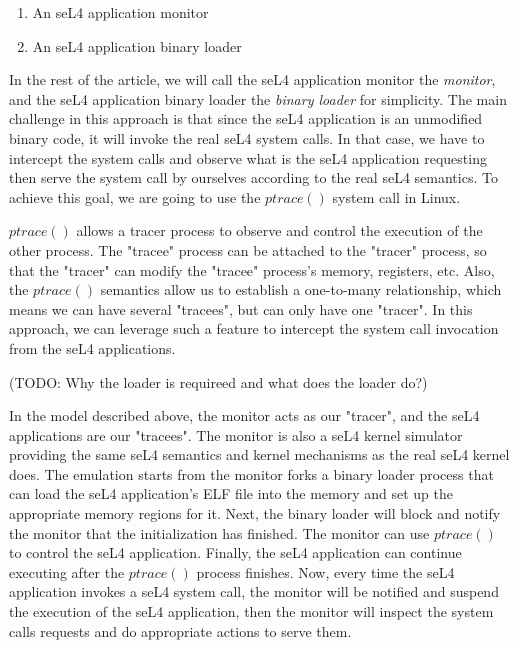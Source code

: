 \begin{enumerate}
    \item An seL4 application monitor
    \item An seL4 application binary loader 
\end{enumerate}

In the rest of the article, we will call the seL4 application monitor the \emph{monitor}, and the seL4 application binary loader the \emph{binary loader} for simplicity. The main challenge in this approach is that since the seL4 application is an unmodified binary code, it will invoke the real seL4 system calls. In that case, we have to intercept the system calls and observe what is the seL4 application requesting then serve the system call by ourselves according to the real seL4 semantics. To achieve this goal, we are going to use the $ptrace()$ system call in Linux.

$ptrace()$ allows a tracer process to observe and control the execution of the other process. The "tracee" process can be attached to the "tracer" process, so that the "tracer" can modify the "tracee" process's memory, registers, etc. Also, the $ptrace()$ semantics allow us to establish a one-to-many relationship, which means we can have several "tracees", but can only have one "tracer". In this approach, we can leverage such a feature to intercept the system call invocation from the seL4 applications.

(TODO: Why the loader is requireed and what does the loader do?)

In the model described above, the monitor acts as our "tracer", and the seL4 applications are our "tracees". The monitor is also a seL4 kernel simulator providing the same seL4 semantics and kernel mechanisms as the real seL4 kernel does. The emulation starts from the monitor forks a binary loader process that can load the seL4 application's ELF file into the memory and set up the appropriate memory regions for it. Next, the binary loader will block and notify the monitor that the initialization has finished. The monitor can use $ptrace()$ to control the seL4 application. Finally, the seL4 application can continue executing after the $ptrace()$ process finishes. Now, every time the seL4 application invokes a seL4 system call, the monitor will be notified and suspend the execution of the seL4 application, then the monitor will inspect the system calls requests and do appropriate actions to serve them.

